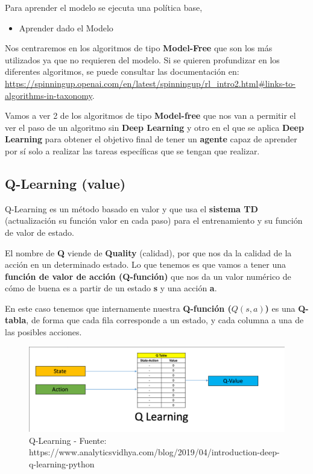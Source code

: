\documentclass[
  a4paper,
  DIV=11,
  numbers=noendperiod]{scrreprt}
\providecommand{\tightlist}{%
  \setlength{\itemsep}{0pt}\setlength{\parskip}{0pt}}\usepackage{longtable,booktabs,array}
\begin{document}
Para aprender el modelo se ejecuta una política base,

\begin{itemize}
\tightlist
\item
  Aprender dado el Modelo
\end{itemize}

Nos centraremos en los algoritmos de tipo \textbf{Model-Free} que son
los más utilizados ya que no requieren del modelo. Si se quieren
profundizar en los diferentes algoritmos, se puede consultar las
documentación en:
\url{https://spinningup.openai.com/en/latest/spinningup/rl_intro2.html\#links-to-algorithms-in-taxonomy}.

Vamos a ver 2 de los algoritmos de tipo \textbf{Model-free} que nos van
a permitir el ver el paso de un algoritmo sin \textbf{Deep Learning} y
otro en el que se aplica \textbf{Deep Learning} para obtener el objetivo
final de tener un \textbf{agente} capaz de aprender por sí solo a
realizar las tareas específicas que se tengan que realizar.

\subsection{Q-Learning (value)}\label{q-learning-value}

Q-Learning es un método basado en valor y que usa el \textbf{sistema TD}
(actualización su función valor en cada paso) para el entrenamiento y su
función de valor de estado.

El nombre de \textbf{Q} viende de \textbf{Quality} (calidad), por que
nos da la calidad de la acción en un determinado estado. Lo que tenemos
es que vamos a tener una \textbf{función de valor de acción (Q-función)}
que nos da un valor numérico de cómo de buena es a partir de un estado
\textbf{s} y una acción \textbf{a}.

En este caso tenemos que internamente nuestra \textbf{Q-función
(}\(Q(s,a)\)\textbf{)} es una \textbf{Q-tabla}, de forma que cada fila
corresponde a un estado, y cada columna a una de las posibles acciones.

\begin{figure}[H]

{\centering \includegraphics{imagenes/capitulo1/rl_qlearning.png}

}

\caption{Q-Learning - Fuente:
https://www.analyticsvidhya.com/blog/2019/04/introduction-deep-q-learning-python}

\end{figure}%
\end{document}
